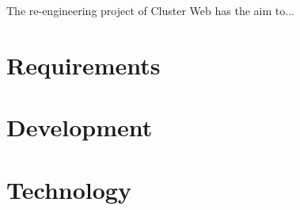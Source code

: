 
The re-engineering project of Cluster Web has the aim to...

\section{Requirements}

\section{Development}

\section{Technology}

